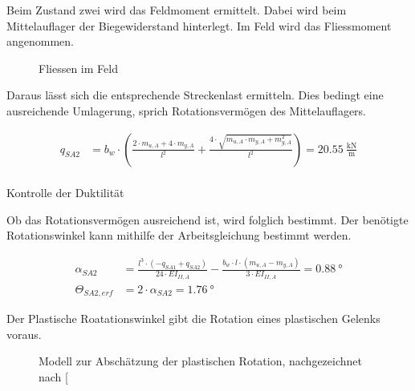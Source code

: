 \documentclass[
  11pt,
  letterpaper,
]{scrreprt}
\makeatletter
\let\oldparagraph\paragraph
\renewcommand{\paragraph}{
    \@ifstar
      \xxxParagraphStar
      \xxxParagraphNoStar
  }
\newcommand{\xxxParagraphStar}[1]{\oldparagraph*{#1}\mbox{}}
\newcommand{\xxxParagraphNoStar}[1]{\oldparagraph{#1}\mbox{}}
\makeatother
\begin{document}
Beim Zustand zwei wird das Feldmoment ermittelt. Dabei wird beim
Mittelauflager der Biegewiderstand hinterlegt. Im Feld wird das
Fliessmoment angenommen.

\begin{figure}[H]


\caption{\label{fig-jag_my_feld_A}Fliessen im Feld}

\end{figure}%

Daraus lässt sich die entsprechende Streckenlast ermitteln. Dies bedingt
eine ausreichende Umlagerung, sprich Rotationsvermögen des
Mittelauflagers.

\[
\begin{aligned}
q_{SA2}& = b_{w} \cdot \left(\frac{2 \cdot m_{u , A} + 4 \cdot m_{y , A}}{l^{2}} + \frac{4 \cdot \sqrt{m_{u , A} \cdot m_{y , A} + m_{y , A}^{2}}}{l^{2}}\right) = 20.55 \ \frac{\mathrm{kN}}{\mathrm{m}} \end{aligned}
\]

\paragraph{Kontrolle der Duktilität}\label{kontrolle-der-duktilituxe4t}

Ob das Rotationsvermögen ausreichend ist, wird folglich bestimmt. Der
benötigte Rotationswinkel kann mithilfe der Arbeitsgleichung bestimmt
werden.

\[
\begin{aligned}
\alpha_{SA2}& = \frac{l^{3} \cdot \left(- q_{SA1} + q_{SA2}\right)}{24 \cdot EI_{II , A}} - \frac{b_{w} \cdot l \cdot \left(m_{u , A} - m_{y , A}\right)}{3 \cdot EI_{II , A}} = 0.88 \ \mathrm{°} \\ 
\Theta_{SA2 , erf}& = 2 \cdot \alpha_{SA2} = 1.76 \ \mathrm{°} \end{aligned}
\]

Der Plastische Roatationswinkel gibt die Rotation eines plastischen
Gelenks voraus.

\begin{figure}[H]


\caption{\label{fig-plast_rot}Modell zur Abschätzung der plastischen
Rotation, nachgezeichnet nach {[}\citeproc{ref-kaufmann_2_2017}{5}{]}}

\end{figure}%
\end{document}
